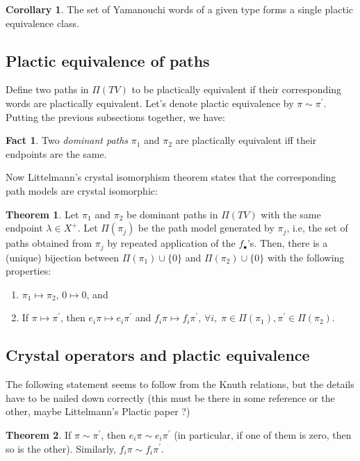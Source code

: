 \documentclass[reqno]{amsart}
\theoremstyle{definition}
\newtheorem{fact}{Fact}
\newtheorem{theorem}{Theorem}[section]
\newtheorem{corollary}{Corollary}
\newcommand{\be}{\begin{enumerate}}
\newcommand{\ee}{\end{enumerate}}
\begin{document}
\begin{corollary}
  The set of Yamanouchi words of a given type forms a single plactic equivalence class.
\end{corollary}


\subsection{Plactic equivalence of paths}
Define two paths in $\Pi(TV)$ to be plactically equivalent if their corresponding words are plactically equivalent. Let's denote plactic equivalence by $\pi \sim \pi^\prime$.
Putting the previous subsections together, we have:
\begin{fact}\label{fact:dom-path-equiv}
  Two {\em dominant paths} $\pi_1$ and $\pi_2$ are plactically equivalent iff their endpoints are the same.
\end{fact}

Now Littelmann's crystal isomorphism theorem states that the corresponding path models are crystal isomorphic:
\begin{theorem}\label{thm:litt-crys-iso}
  Let $\pi_1$ and $\pi_2$ be dominant paths in $\Pi(TV)$ with the same endpoint $\lambda \in X^+$. Let $\Pi(\pi_j)$ be the path model generated by $\pi_j$, i.e, the set of paths obtained from $\pi_j$ by repeated application of the $f_{\bullet}$'s. Then, there is a (unique) bijection between $\Pi(\pi_1) \cup \{0\}$ and $\Pi(\pi_2) \cup \{0\}$ with the following properties:
\be
\item $\pi_1 \mapsto \pi_2$, $0 \mapsto 0$, and
\item If $\pi \mapsto \pi^\prime$, then $e_i \pi \mapsto e_i \pi^\prime$ and $f_i \pi \mapsto f_i \pi^\prime$, $\forall i, \; \pi \in \Pi(\pi_1), \pi^\prime \in \Pi(\pi_2)$.
\ee
\end{theorem}


\subsection{Crystal operators and plactic equivalence}
The following statement seems to follow from the Knuth relations, but the details have to be nailed down correctly (this must be there in some reference or the other, maybe Littelmann's Plactic paper ?)

\begin{theorem}\label{thm:crys-plac}
If $\pi \sim \pi^\prime$, then $e_i \pi \sim e_i \pi^\prime$ (in particular, if one of them is zero, then so is the other). Similarly, $f_i \pi \sim f_i \pi^\prime$. 
\end{theorem}
\end{document}
